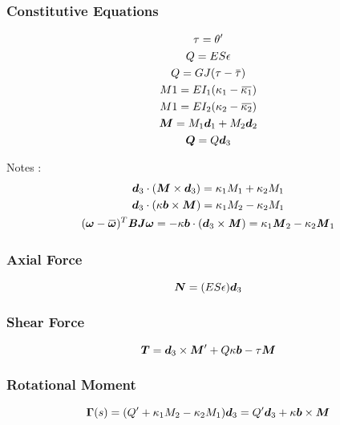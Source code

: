 \subsubsection{Constitutive Equations}
\begin{subequations}
	\begin{gather}
	\tau = \theta' \\
	Q = ES\epsilon \\
	Q = GJ(\tau -{\overbar{\tau}}) \\
	M1 = EI_1(\kappa_1-{\overbar{\kappa_1}}) \\
	M1 = EI_2(\kappa_2-{\overbar{\kappa_2}}) \\
	\vect{M} = M_1\vect{d}_1 + M_2\vect{d}_2 \\
	\vect{Q} = Q\vect{d}_3
	\end{gather}
\end{subequations}

Notes :
\begin{subequations}
	\begin{gather}
	\vect{d}_3 \cdot (\vect{M} \times \vect{d}_3) = \kappa_1 M_1 + \kappa_2 M_1 \\
	\vect{d}_3 \cdot (\kappa\vect{b} \times \vect{M}) = \kappa_1 M_2 - \kappa_2 M_1 \\
	(\vect{\omega} - \overbar{\vect{\omega}})^T \mat{B} \mat{J}\vect{\omega}
	 = - \kappa\vect{b} \cdot (\vect{d}_3 \times \mat{M})
	 = \kappa_1 \mat{M}_2 -  \kappa_2 \mat{M}_1
	\end{gather}
\end{subequations}

\subsubsection{Axial Force}
\begin{equation}
	\boldsymbol{N} = (ES \epsilon) \boldsymbol{d}_3
\end{equation}

\subsubsection{Shear Force}
\begin{equation}
	\boldsymbol{T}= \boldsymbol{d}_3 \times \boldsymbol{M}'
		  + Q\kappa\boldsymbol{b} - \tau \boldsymbol{M}
\end{equation}
\subsubsection{Rotational Moment}
\begin{equation}
	\boldsymbol{\Gamma}(s) = (Q' + \kappa_1 M_2 - \kappa_2 M_1)\boldsymbol{d}_3
	= Q' \boldsymbol{d}_3 + \kappa\boldsymbol{b} \times \boldsymbol{M}
\end{equation}
